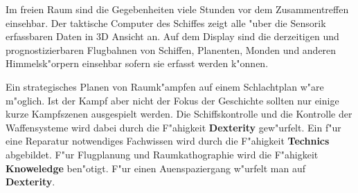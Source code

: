 Im freien Raum sind die Gegebenheiten viele Stunden vor dem Zusammentreffen einsehbar. Der taktische Computer des Schiffes zeigt alle "uber die Sensorik erfassbaren Daten in 3D Ansicht an. Auf dem Display sind die derzeitigen und prognostizierbaren Flugbahnen von Schiffen, Planenten, Monden und anderen Himmelsk"orpern einsehbar sofern sie erfasst werden k"onnen.

Ein strategisches Planen von Raumk"ampfen auf einem Schlachtplan w"are m"oglich. Ist der Kampf aber nicht der Fokus der Geschichte sollten nur einige kurze Kampfszenen ausgespielt werden. Die Schiffskontrolle und die Kontrolle der Waffensysteme wird dabei durch die F"ahigkeit \textbf{Dexterity} gew"urfelt. Ein f"ur eine Reparatur notwendiges Fachwissen wird durch die F"ahigkeit \textbf{Technics} abgebildet. F"ur Flugplanung und Raumkathographie wird die F"ahigkeit \textbf{Knoweledge} ben"otigt. F"ur einen Au\3enspaziergang w"urfelt man auf \textbf{Dexterity}.
